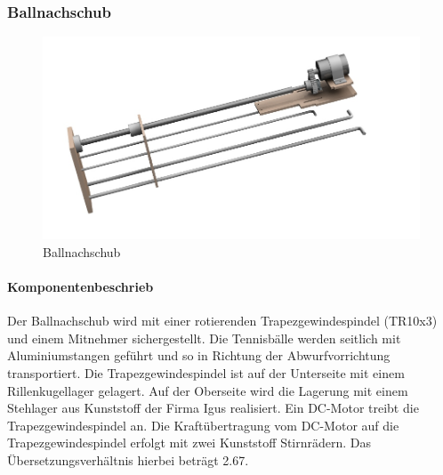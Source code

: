 \subsubsection{Ballnachschub}
\begin{figure}[h!]
	\centering
	\includegraphics[width=\linewidth]{../../fig/Ballnachschub}
	\caption{Ballnachschub}
	\label{fig:Ballnachschub}
\end{figure}
\paragraph{Komponentenbeschrieb\\}
Der Ballnachschub wird mit einer rotierenden Trapezgewindespindel (TR10x3) und einem Mitnehmer sichergestellt. Die Tennisbälle werden seitlich mit Aluminiumstangen geführt und so in Richtung der Abwurfvorrichtung transportiert. Die Trapezgewindespindel ist auf der Unterseite mit einem Rillenkugellager gelagert. Auf der Oberseite wird die Lagerung mit einem Stehlager aus Kunststoff der Firma Igus realisiert. Ein DC-Motor treibt die Trapezgewindespindel an. Die Kraftübertragung vom DC-Motor auf die Trapezgewindespindel erfolgt mit zwei Kunststoff Stirnrädern. Das Übersetzungsverhältnis hierbei beträgt 2.67.

